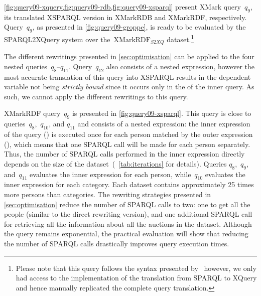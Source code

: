 \cref{fig:query09-xquery,fig:query09-rdb,fig:query09-xsparql} present XMark query~$q_9$, its translated XSPARQL version
in XMarkRDB and XMarkRDF, respectively.
%
Query~$q_{9}$, as presented in \cref{fig:query09-groppe}, is ready to be evaluated by the SPARQL2XQuery system
over the~$\textrm{XMarkRDF}_{\mathit{S2XQ}}$ dataset.\footnote{Please note that this query follows the syntax presented
by~\citet{GroppeGroppeLinnemann:2008aa} however, we only had access to the implementation of the translation from SPARQL
to XQuery and hence manually replicated the complete query translation.}

The different rewritings presented in \cref{sec:optimisation} can be applied to the four nested
queries~$q_8$--$q_{11}$.
%
Query~$q_{12}$ also consists of a nested expression, however the most accurate translation of this query into XSPARQL
results in the dependent variable not being \emph{strictly bound} since it occurs only in the \FILTER of the inner
query. As such, we cannot apply the different rewritings to this query.
%

XMarkRDF query~$q_9$ is presented in \cref{fig:query09-xsparql}. This query is close to queries~$q_8$,~$q_{10}$, and
$q_{11}$ and consists of a nested expression: the inner \FOR expression of the query
() is executed once for each person matched by the outer
expression (), which means that one SPARQL call will be
made for each person separately.  
%
Thus, the number of SPARQL calls performed in the inner expression directly depends on the size of the
dataset~(\cf~\cref{tab:iterations} for details).
%
Queries $q_8$,~$q_{9}$, and~$q_{11}$ evaluates the inner expression for each person, while~$q_{10}$ evaluates the inner
expression for each category.  Each dataset contains approximately 25 times more persons than categories.
%
The rewriting strategies presented in \cref{sec:optimisation} reduce the number of SPARQL calls to two: one to
get all the people (similar to the direct rewriting version), and one additional SPARQL call for retrieving all the
information about all the auctions in the dataset.  
%
Although the query remains exponential, the practical evaluation will show that reducing the number of SPARQL calls
drastically improves query execution times.




